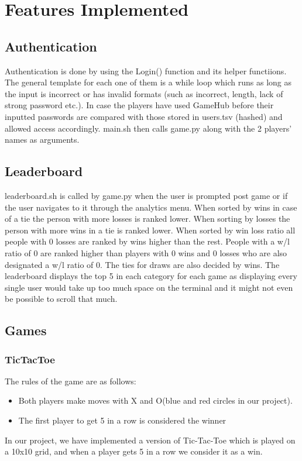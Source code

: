 \documentclass[12pt, letter]{article}
\begin{document}
\section{Features Implemented}

\subsection{Authentication}
Authentication is done by using the Login() function and its helper functiions. The general template for each one of them is a while loop which runs as long as the input is incorrect or has invalid formats (such as incorrect, length, lack of strong password etc.). In case the players have used GameHub before their inputted passwords are compared with those stored in users.tsv (hashed) and allowed access accordingly.
main.sh then calls game.py along with the 2 players' names as arguments.

\subsection{Leaderboard}
leaderboard.sh is called by game.py when the user is prompted post game or if the user navigates to it through the analytics menu. When sorted by wins in case of a tie the person with more losses is ranked lower. When sorting by losses the person with more wins in a tie is ranked lower. When sorted by win loss ratio all people with 0 losses are ranked by wins higher than the rest. People with a w/l ratio of 0 are ranked higher than players with 0 wins and 0 losses who are also designated a w/l ratio of 0. The ties for draws are also decided by wins. The leaderboard displays the top 5 in each category for each game as displaying every single user would take up too much space on the terminal and it might not even be possible to scroll that much.

\subsection{Games}

\subsubsection{TicTacToe}
The rules of the game are as follows:
\begin{itemize}
    \item Both players make moves with X and O(blue and red circles in our project).
    \item The first player to get 5 in a row is considered the winner
    
\end{itemize}
In our project, we have implemented a version of Tic-Tac-Toe which is played on a 10x10 grid, and when a player gets 5 in a row we consider it as a win.
\end{document}
